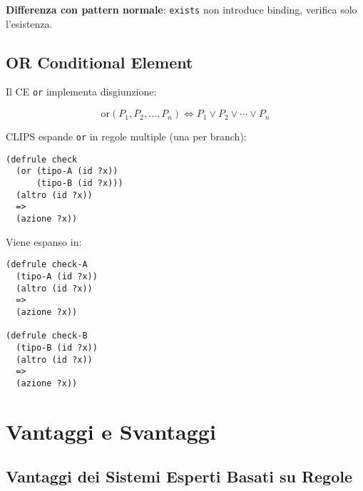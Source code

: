 \textbf{Differenza con pattern normale}: \texttt{exists} non introduce binding, verifica solo l'esistenza.

\subsection{OR Conditional Element}

Il CE \texttt{or} implementa disgiunzione:

\begin{equation}
\text{or}(P_1, P_2, \ldots, P_n) \Leftrightarrow P_1 \lor P_2 \lor \cdots \lor P_n
\end{equation}

CLIPS espande \texttt{or} in regole multiple (una per branch):

\begin{esempio}[Espansione OR]
\begin{lstlisting}[language=CLIPS]
(defrule check
  (or (tipo-A (id ?x))
      (tipo-B (id ?x)))
  (altro (id ?x))
  =>
  (azione ?x))
\end{lstlisting}

Viene espanso in:
\begin{lstlisting}[language=CLIPS]
(defrule check-A
  (tipo-A (id ?x))
  (altro (id ?x))
  =>
  (azione ?x))

(defrule check-B
  (tipo-B (id ?x))
  (altro (id ?x))
  =>
  (azione ?x))
\end{lstlisting}
\end{esempio}

\section{Vantaggi e Svantaggi}

\subsection{Vantaggi dei Sistemi Esperti Basati su Regole}

